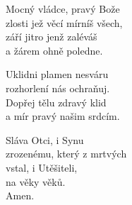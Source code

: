 \begin{translatioMulticol}{3}
Mocný vládce, pravý Bože\\
zlosti jež věcí mírníš všech,\\
září jitro jenž zaléváš\\
a žárem ohně poledne.\columnbreak

Uklidni plamen nesváru\\
rozhorlení nás ochraňuj.\\
Dopřej tělu zdravý klid\\
a mír pravý našim srdcím.\columnbreak

Sláva Otci, i Synu\\
zrozenému, který z mrtvých\\
vstal, i Utěšiteli,\\
na věky věků.\\
Amen.
\end{translatioMulticol}
